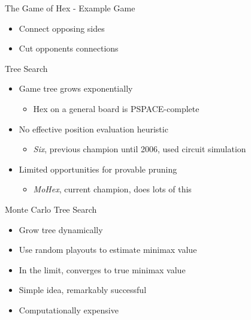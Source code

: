 \documentclass{beamer}
\begin{document}
\begin{frame}{The Game of Hex - Example Game}
	\begin{figure}[tb]
	\end{figure}
	\begin{itemize}
		\item Connect opposing sides
		\item Cut opponents connections
	\end{itemize}
\end{frame}

\begin{frame}{Tree Search}
\begin{itemize}
	\item Game tree grows exponentially
	\begin{itemize}
		\item Hex on a general board is PSPACE-complete
	\end{itemize}
	\item No effective position evaluation heuristic
	\begin{itemize}
		\item \emph{Six}, previous champion until 2006, used circuit simulation
	\end{itemize}
	\item Limited opportunities for provable pruning
	\begin{itemize}
		\item \emph{MoHex}, current champion, does lots of this
	\end{itemize}
\end{itemize}
\end{frame}

\begin{frame}{Monte Carlo Tree Search}
\begin{itemize}
	\item Grow tree dynamically
	\item Use random playouts to estimate minimax value
	\item In the limit, converges to true minimax value
	\item Simple idea, remarkably successful
	\item Computationally expensive
\end{itemize}
\end{frame}
\end{document}
